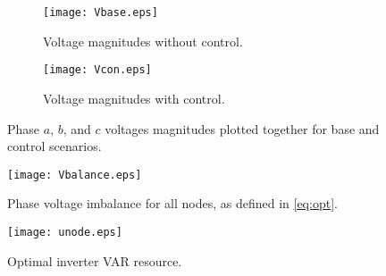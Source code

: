 
\begin{figure*}[t]
	\centering
	\begin{subfigure}[b]{0.49\textwidth}
		\centering
		\texttt{[image: Vbase.eps]}
		\caption{Voltage magnitudes without control.}
		\label{fig:Vbase}
	\end{subfigure}
    \begin{subfigure}[b]{0.49\textwidth}
		\centering
		\texttt{[image: Vcon.eps]}
		\caption{Voltage magnitudes with control.}
		\label{fig:Vcon}
	\end{subfigure}
    \caption{Phase $a$, $b$, and $c$ voltages magnitudes plotted together for base and control scenarios.}
	\label{fig:VbaseVcon}
\end{figure*}

\begin{figure}[t]
	\centering
	\texttt{[image: Vbalance.eps]}
	\caption{Phase voltage imbalance for all nodes, as defined in \eqref{eq:opt}.}
	\label{fig:Vbalance}
\end{figure}

\begin{figure}[t]
	\centering
	\texttt{[image: unode.eps]}
	\caption{Optimal inverter VAR resource.}
	\label{fig:unode}
\end{figure}